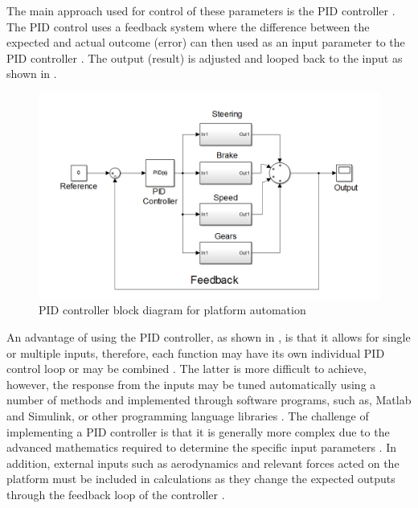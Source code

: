 \documentclass[main.tex]{subfiles}
\begin{document}
The main approach used for control of these parameters is the PID controller \parencite{zhao2012design,tran2007modelling,johnson2005pid}. 
The PID control uses a feedback system where the difference between the expected and actual outcome (error) can then used as an input parameter to the PID controller \parencite{johnson2005pid}. The output (result) is adjusted and looped back to the input as shown in . 

\begin{figure}[ht]
\includegraphics[width=\textwidth]{3-LiteratureReview/PIDblock.PNG}
\centering
\caption[PID controller block diagram for platform automation]{PID controller block diagram for platform automation\parencite{johnson2005pid}} 
\end{figure}

An advantage of using the PID controller, as shown in , is that it allows for single or multiple inputs, therefore, each function may have its own individual PID control loop or may be combined \parencite{johnson2005pid}. The latter is more difficult to achieve, however, the response from the inputs may be tuned automatically using a number of methods and implemented through software programs, such as, Matlab and Simulink, or other programming language libraries \parencite{tran2007modelling,johnson2005pid}. The challenge of implementing a  PID controller is that it is generally more complex due to the advanced mathematics required to determine the specific input parameters \parencite{tran2007modelling}. In addition, external inputs such as aerodynamics and relevant forces acted on the platform must be included in calculations as they change the expected outputs through the feedback loop of the controller \parencite{zhao2012design,johnson2005pid}. 
\end{document}
